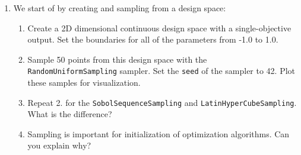 \documentclass[10pt,a4paper,twoside]{article} %
\def\code#1{\texttt{#1}}
\begin{document}
\begin{enumerate}
	\setcounter{enumi}{0}
	\item We start of by creating and sampling from a design space:

	\begin{enumerate} [label*=\arabic*.]
		\item Create a 2D dimensional continuous design space with a single-objective output. Set the boundaries for all of the parameters from -1.0 to 1.0.
		
		\item Sample 50 points from this design space with the \code{RandomUniformSampling} sampler. Set the \code{seed} of the sampler to 42. Plot these samples for visualization.
		
		\item Repeat 2. for the \code{SobolSequenceSampling} and \code{LatinHyperCubeSampling}. What is the difference?
		
		\item Sampling is important for initialization of optimization algorithms. Can you explain why?
	\end{enumerate}
\end{enumerate}
\end{document}
